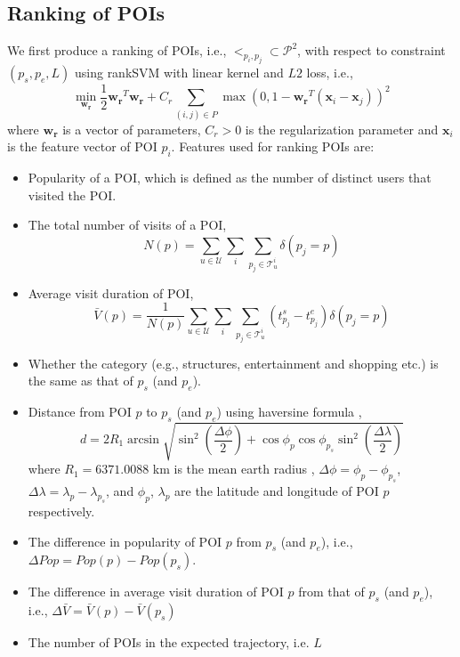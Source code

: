 \subsection{Ranking of POIs}
\label{method:ranking}
We first produce a ranking of POIs, i.e., $<_{p_i, p_j} \subset \mathcal{P}^2$,
with respect to constraint $(p_s, p_e, L)$ 
using rankSVM with linear kernel and $L2$ loss\cite{lranksvm}, 
i.e.,
\begin{displaymath}
\min_{\mathbf{w_r}} \frac{1}{2} \mathbf{w_r}^T \mathbf{w_r} +
                  C_r \sum_{(i, j) \in P} \max \left( 0, 1 - \mathbf{w_r}^T (\mathbf{x}_i - \mathbf{x}_j) \right)^2
\end{displaymath}
where $\mathbf{w_r}$ is a vector of parameters, 
$C_r > 0$ is the regularization parameter and 
$\mathbf{x}_i$ is the feature vector of POI $p_i$.
Features used for ranking POIs are:
\begin{itemize}
\item Popularity of a POI, which is defined as the number of distinct users that visited the POI\cite{ht10}.
\item The total number of visits of a POI,
      \begin{displaymath}
          N(p) = \sum_{u \in \mathcal{U}} \sum_i \sum_{p_j \in \mathcal{T}_u^i} \delta(p_j = p)
      \end{displaymath}
\item Average visit duration of POI\cite{ijcai15},
      \begin{displaymath}
          \bar{V}(p) = \frac{1}{N(p)} \sum_{u \in \mathcal{U}} \sum_i \sum_{p_j \in \mathcal{T}_u^i} (t_{p_j}^s - t_{p_j}^e) \delta(p_j = p)
      \end{displaymath}
\item Whether the category (e.g., structures, entertainment and shopping etc.) is the same as that of $p_s$ (and $p_e$).
\item Distance from POI $p$ to $p_s$ (and $p_e$) using haversine formula \cite{haversine},
      \begin{displaymath}
      d = 2 R_1 \arcsin \sqrt{ \sin^2 \left( \frac{\Delta \phi}{2} \right) + 
           \cos \phi_p \cos \phi_{p_s} \sin^2 \left( \frac{\Delta \lambda}{2} \right) }
      \end{displaymath}
            where $R_1 = 6371.0088$ km is the mean earth radius \cite{earth_radius}, 
            $\Delta \phi = \phi_p - \phi_{p_s}$, $\Delta \lambda = \lambda_p - \lambda_{p_s}$,
            and $\phi_p$, $\lambda_p$ are the latitude and longitude of POI $p$ respectively.
\item The difference in popularity of POI $p$ from $p_s$ (and $p_e$),
      i.e., $\Delta Pop = Pop(p) - Pop(p_s)$.
\item The difference in average visit duration of POI $p$ from that of $p_s$ (and $p_e$),
      i.e., $\Delta \bar{V} = \bar{V}(p) - \bar{V}(p_s)$
\item The number of POIs in the expected trajectory, i.e. $L$
\end{itemize}

